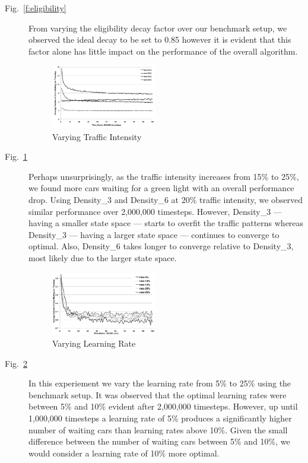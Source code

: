 \begin{description}
\item[Fig.~\ref{f:eligibility}] From varying the eligibility decay factor over
our benchmark setup, we observed the ideal decay to be set to 0.85 however it is
evident that this factor alone has little impact on the performance of the
overall algorithm.

\begin{figure}
\centering
\includegraphics[width=0.45\textwidth]{intensity}
\caption{Varying Traffic Intensity}\label{f:intensity}
\end{figure}

\item[Fig.~\ref{f:intensity}] Perhaps unsurprisingly, as the traffic intensity
increases from 15\% to 25\%, we found more cars waiting for a green light with
an overall performance drop. Using Density\_3 and Density\_6 at 20\% traffic
intensity, we observed similar performance over 2,000,000 timesteps. However,
Density\_3 --- having a smaller state space --- starts to overfit the traffic
patterns whereas Density\_3 --- having a larger state space --- continues to
converge to optimal. Also, Density\_6 takes longer to converge relative to
Density\_3, most likely due to the larger state space.

\begin{figure}
\centering
\includegraphics[width=0.45\textwidth]{learningRate}
\caption{Varying Learning Rate}\label{f:learningRate}
\end{figure}

\item[Fig.~\ref{f:learningRate}] In this experiement we vary the learning rate
from 5\% to 25\% using the benchmark setup. It was observed that the optimal
learning rates were between 5\% and 10\% evident after 2,000,000 timesteps.
However, up until 1,000,000 timesteps a learning rate of 5\% produces a
significantly higher number of waiting cars than learning rates above 10\%.
Given the small difference between the number of waiting cars between 5\% and
10\%, we would consider a learning rate of 10\% more optimal.


\end{description}
